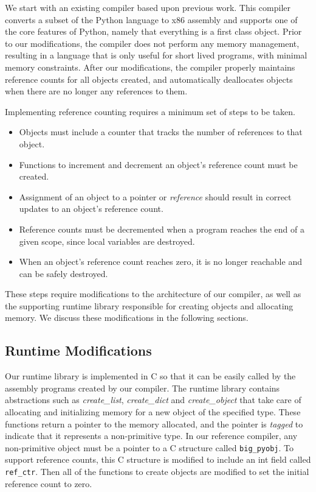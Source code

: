 \documentclass{sigplanconf}
\newcommand{\afunction}[1]{\textit{#1}}
\newcommand{\atype}[1]{\texttt{#1}}
\newcommand{\afield}[1]{\texttt{#1}}
\begin{document}
We start with an existing compiler based upon previous work\cite{siek}.  This compiler converts a subset of the Python language to x86 assembly and supports one of the core features of Python, namely that everything is a first class object.  Prior to our modifications, the compiler does not perform any memory management, resulting in a language that is only useful for short lived programs, with minimal memory constraints.  After our modifications, the compiler properly maintains reference counts for all objects created, and automatically deallocates objects when there are no longer any references to them.

Implementing reference counting requires a minimum set of steps to be taken.

\begin{itemize}
\item Objects must include a counter that tracks the number of references to that object.
\item Functions to increment and decrement an object's reference count must be created.
\item Assignment of an object to a pointer or \textit{reference} should result in correct updates to an object's reference count.
\item Reference counts must be decremented when a program reaches the end of a given scope, since local variables are destroyed.
\item When an object's reference count reaches zero, it is no longer reachable and can be safely destroyed.

\end{itemize}

These steps require modifications to the architecture of our compiler, as well as the supporting runtime library responsible for creating objects and allocating memory.  We discuss these modifications in the following sections.

\subsection{Runtime Modifications}
Our runtime library is implemented in C so that it can be easily called by the assembly programs created by our compiler.  The runtime library contains abstractions such as \afunction{create\_list}, \afunction{create\_dict} and \afunction{create\_object} that take care of allocating and initializing memory for a new object of the specified type.  These functions return a pointer to the memory allocated, and the pointer is \textit{tagged} to indicate that it represents a non-primitive type.  In our reference compiler, any non-primitive object must be a pointer to a C structure called \atype{big\_pyobj}.  To support reference counts, this C structure is modified to include an int field called \afield{ref\_ctr}.  Then all of the functions to create objects are modified to set the initial reference count to zero.
\end{document}
